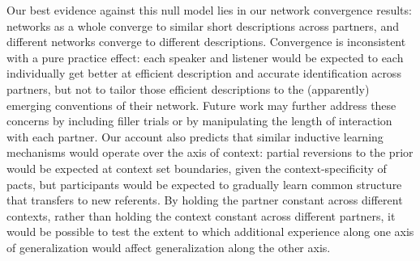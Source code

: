 Our best evidence against this null model lies in our network convergence results: networks as a whole converge to similar short descriptions across partners, and different networks converge to different descriptions.
Convergence is inconsistent with a pure practice effect: each speaker and listener would be expected to each individually get better at efficient description and accurate identification across partners, but not to tailor those efficient descriptions to the (apparently) emerging conventions of their network.
Future work may further address these concerns by including filler trials or by manipulating the length of interaction with each partner.
Our account also predicts that similar inductive learning mechanisms would operate over the axis of context: partial reversions to the prior would be expected at context set boundaries, given the context-specificity of pacts, but participants would be expected to gradually learn common structure that transfers to new referents. 
By holding the partner constant across different contexts, rather than holding the context constant across different partners, it would be possible to test the extent to which additional experience along one axis of generalization would affect generalization along the other axis. 


